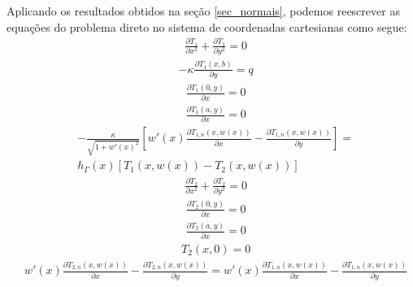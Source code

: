 Aplicando os resultados obtidos na seção \ref{sec_normais},
podemos reescrever as equações do problema direto no sistema de coordenadas cartesianas como segue:
\begin{align}
	& \frac{\partial T_1}{\partial x^2} + \frac{\partial T_1}{\partial y^2} = 0 \label{harm_T1_cart}
\end{align}
\begin{align}
	& -\kappa \frac{\partial T_1(x, b)}{\partial y} = q  \label{cc_T1_2_cart}
\end{align}
\begin{align}	
	& \frac{\partial T_1(0, y)}{\partial x} = 0 \label{cc_T1_1_0_cart}
\end{align}
\begin{align}	
	& \frac{\partial T_1(a, y)}{\partial x} = 0 \label{cc_T1_1_a_cart}
\end{align}
\begin{align}	
	& -\frac{\kappa}{\sqrt{1 + w'(x)^2}}\left[w'(x)\frac{\partial T_{1,n}(x, w(x))}{\partial x} - \frac{\partial T_{1,n}(x, w(x))}{\partial y}\right] = \nonumber \\
	& h_\Gamma(x)[T_1(x, w(x))-T_2(x, w(x))] \label{cc_grad_T1_cart}
\end{align}
\begin{align}
	& \frac{\partial T_2}{\partial x^2} + \frac{\partial T_2}{\partial y^2} = 0 \label{harm_T2_cart}
\end{align}
\begin{align}	
	& \frac{\partial T_2(0, y)}{\partial x} = 0 \label{cc_T1_3_0_cart}
\end{align}
\begin{align}	
	& \frac{\partial T_2(a, y)}{\partial x} = 0 \label{cc_T1_3_a_cart}
\end{align}
\begin{align}	
	& T_2(x, 0) = 0 \label{cc_T1_4_cart}
\end{align}
\begin{align}
	& w'(x)\frac{\partial T_{2,n}(x, w(x))}{\partial x} - \frac{\partial T_{2,n}(x, w(x))}{\partial y} = 
	w'(x)\frac{\partial T_{1,n}(x, w(x))}{\partial x} - \frac{\partial T_{1,n}(x, w(x))}{\partial y} \label{cc_T1_5_cart}
\end{align}

